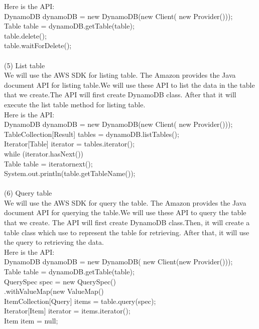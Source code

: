     Here is the API\cite{w1}:\\
    DynamoDB dynamoDB = new DynamoDB(new Client(
    new Provider()));\\
    Table table = dynamoDB.getTable(table);\\
    table.delete();\\
    table.waitForDelete();\\
\\
    (5) List table\\
    We will use the AWS SDK for listing table. The Amazon provides the Java document API for listing table.We will use these API to list the data in the table that we create.The API will first create DynamoDB class. After that it will execute the list table method for listing table.\\
    Here is the API\cite{w1}:\\
    DynamoDB dynamoDB = new DynamoDB(new Client(
       new Provider()));\\
    TableCollection[Result] tables = dynamoDB.listTables();\\
    Iterator[Table] iterator = tables.iterator();\\
    while (iterator.hasNext()) \\
    Table table = iteratornext();\\
    System.out.println(table.getTableName());\\
\\
    (6) Query table \\
    We will use the AWS SDK for query the table. The Amazon provides the Java document API for querying the table.We will use these API to query the table that we create. The API will first create DynamoDB class.Then, it will create a table class which use to represent the table for retrieving. After that, it will use the query to retrieving the data.\\
    Here is the API\cite{w2}:\\
    DynamoDB dynamoDB = new DynamoDB(
    new Client(new Provider()));\\
    Table table = dynamoDB.getTable(table);\\
    QuerySpec spec = new QuerySpec()\\
    .withValueMap(new ValueMap()\\
    ItemCollection[Query] items = table.query(spec);\\
    Iterator[Item] iterator = items.iterator();\\
    Item item = null;\\
